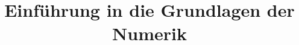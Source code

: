 \title{Einführung in die Grundlagen der Numerik}
\pretitle{\pagestyle{empty}\begin{center}  \Huge \bfseries}
	\renewcommand{\maketitlehookb}{\centering \Large  \textit{Vorlesungsmitschriften im Wintersemester 2018/19}}
\date{}
